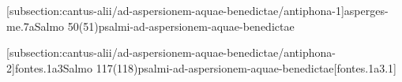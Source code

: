 \def\Prefix{subsection:cantus-alii/ad-aspersionem-aquae-benedictae}

[\Prefix/antiphona-1]{asperges-me.7a}{Salmo 50(51)}{psalmi-ad-aspersionem-aquae-benedictae}

\AllowPageFlush

[\Prefix/antiphona-2]{fontes.1a3}{Salmo 117(118)}{psalmi-ad-aspersionem-aquae-benedictae}[fontes.1a3.1]